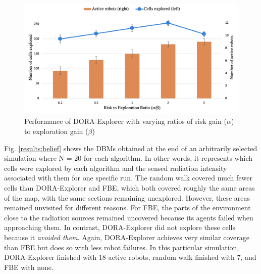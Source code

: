 \documentclass[letterpaper, 10 pt, conference]{ieeeconf}
\begin{document}
\begin{figure}[h]
    \centering
    \includegraphics[width=0.95\columnwidth]{images/parameters.png}
    \caption{Performance of DORA-Explorer with varying ratios of risk gain ($\alpha$) to exploration gain ($\beta$)}
    \label{results:parameters}
\end{figure}

Fig. \ref{results:belief} shows the DBMs obtained at the end of an
arbitrarily selected simulation where N = 20 for each algorithm.  In
other words, it represents which cells were explored by each algorithm
and the sensed radiation intensity associated with them for one specific run. The random
walk covered much fewer cells than DORA-Explorer and FBE, which both covered
roughly the same areas of the map, with the same sections remaining
unexplored. However, these areas remained unvisited for different
reasons. For FBE, the parts of the environment close to the radiation
sources remained uncovered because its agents failed when approaching
them. In contrast, DORA-Explorer did not explore these cells because it
\textit{avoided them}. Again, DORA-Explorer achieves very similar coverage than
FBE but does so with less robot failures. In this particular
simulation, DORA-Explorer finished with 18 active robots, random walk finished
with 7, and FBE with none.
\end{document}
